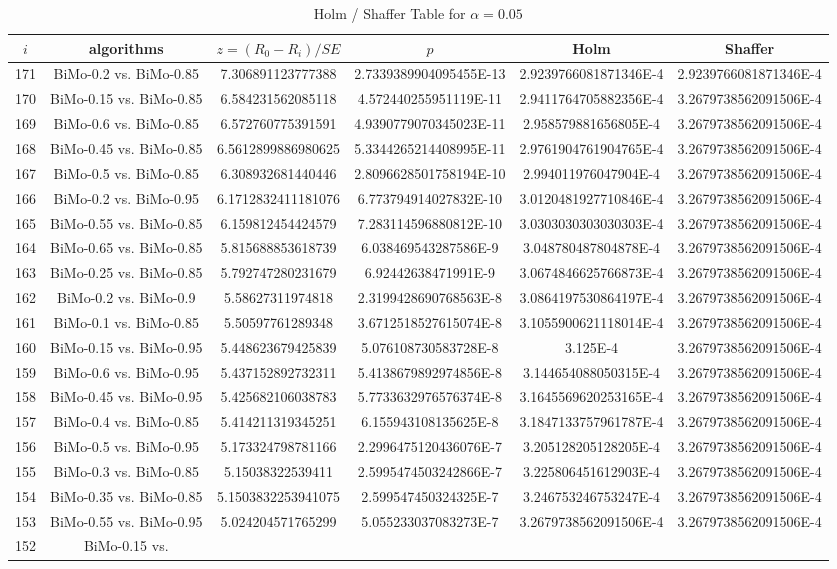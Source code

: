 \documentclass[a4paper,10pt]{article}
\begin{document}
\begin{landscape}
\begin{table}[!htp]
\centering\tiny
\caption{Holm / Shaffer Table for $\alpha=0.05$}
\begin{tabular}{cccccc}
$i$&algorithms&$z=(R_0 - R_i)/SE$&$p$&Holm&Shaffer\\
\hline
171&BiMo-0.2 vs. BiMo-0.85&7.306891123777388&2.7339389904095455E-13&2.9239766081871346E-4&2.9239766081871346E-4\\170&BiMo-0.15 vs. BiMo-0.85&6.584231562085118&4.572440255951119E-11&2.9411764705882356E-4&3.2679738562091506E-4\\169&BiMo-0.6 vs. BiMo-0.85&6.572760775391591&4.9390779070345023E-11&2.958579881656805E-4&3.2679738562091506E-4\\168&BiMo-0.45 vs. BiMo-0.85&6.5612899886980625&5.3344265214408995E-11&2.9761904761904765E-4&3.2679738562091506E-4\\167&BiMo-0.5 vs. BiMo-0.85&6.308932681440446&2.8096628501758194E-10&2.994011976047904E-4&3.2679738562091506E-4\\166&BiMo-0.2 vs. BiMo-0.95&6.1712832411181076&6.773794914027832E-10&3.0120481927710846E-4&3.2679738562091506E-4\\165&BiMo-0.55 vs. BiMo-0.85&6.159812454424579&7.283114596880812E-10&3.0303030303030303E-4&3.2679738562091506E-4\\164&BiMo-0.65 vs. BiMo-0.85&5.815688853618739&6.038469543287586E-9&3.048780487804878E-4&3.2679738562091506E-4\\163&BiMo-0.25 vs. BiMo-0.85&5.792747280231679&6.92442638471991E-9&3.0674846625766873E-4&3.2679738562091506E-4\\162&BiMo-0.2 vs. BiMo-0.9&5.58627311974818&2.3199428690768563E-8&3.0864197530864197E-4&3.2679738562091506E-4\\161&BiMo-0.1 vs. BiMo-0.85&5.50597761289348&3.6712518527615074E-8&3.1055900621118014E-4&3.2679738562091506E-4\\160&BiMo-0.15 vs. BiMo-0.95&5.448623679425839&5.076108730583728E-8&3.125E-4&3.2679738562091506E-4\\159&BiMo-0.6 vs. BiMo-0.95&5.437152892732311&5.4138679892974856E-8&3.144654088050315E-4&3.2679738562091506E-4\\158&BiMo-0.45 vs. BiMo-0.95&5.425682106038783&5.7733632976576374E-8&3.1645569620253165E-4&3.2679738562091506E-4\\157&BiMo-0.4 vs. BiMo-0.85&5.414211319345251&6.155943108135625E-8&3.1847133757961787E-4&3.2679738562091506E-4\\156&BiMo-0.5 vs. BiMo-0.95&5.173324798781166&2.2996475120436076E-7&3.205128205128205E-4&3.2679738562091506E-4\\155&BiMo-0.3 vs. BiMo-0.85&5.15038322539411&2.5995474503242866E-7&3.225806451612903E-4&3.2679738562091506E-4\\154&BiMo-0.35 vs. BiMo-0.85&5.1503832253941075&2.599547450324325E-7&3.246753246753247E-4&3.2679738562091506E-4\\153&BiMo-0.55 vs. BiMo-0.95&5.024204571765299&5.055233037083273E-7&3.2679738562091506E-4&3.2679738562091506E-4\\152&BiMo-0.15 vs. 
\end{tabular}
\end{table}
\end{landscape}
\end{document}
